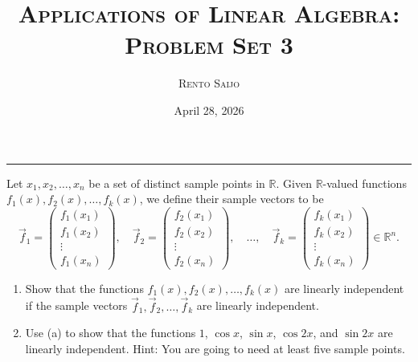 \documentclass[10pt]{extarticle}
\title{\centering\Large\textsc{Applications of Linear Algebra: Problem Set 3}}
\author{\large \textsc{Rento Saijo}}
\date{April 28, 2026}
\begin{document}
\maketitle
\thispagestyle{fancy}
\vspace{-1em}\noindent\rule{\linewidth}{0.6pt}\vspace{0.5em}

\begin{problem}[Problem 1]
Let $x_1,x_2,\dots,x_n$ be a set of distinct sample points in $\mathbb{R}$. Given $\mathbb{R}$-valued functions $f_1(x), f_2(x),\dots,f_k(x)$, we define their sample vectors to be
\[
\vec{f}_1=\begin{pmatrix}f_1(x_1)\\f_1(x_2)\\ \vdots\\f_1(x_n)\end{pmatrix},
\quad
\vec{f}_2=\begin{pmatrix}f_2(x_1)\\f_2(x_2)\\ \vdots\\f_2(x_n)\end{pmatrix},
\quad \dots,\quad
\vec{f}_k=\begin{pmatrix}f_k(x_1)\\f_k(x_2)\\ \vdots\\f_k(x_n)\end{pmatrix}\in\mathbb{R}^n.
\]
\begin{enumerate}[label=(\alph*)]
\item Show that the functions $f_1(x),f_2(x),\dots,f_k(x)$ are linearly independent if the sample vectors $\vec{f}_1,\vec{f}_2,\dots,\vec{f}_k$ are linearly independent.
\item Use (a) to show that the functions $1$, $\cos x$, $\sin x$, $\cos 2x$, and $\sin 2x$ are linearly independent. Hint: You are going to need at least five sample points.
\end{enumerate}
\end{problem}
\end{document}

